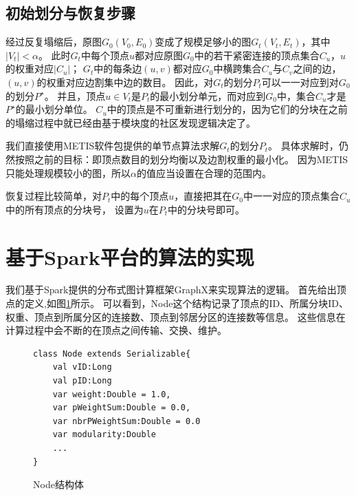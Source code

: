 \documentclass[master]{njuthesis}
\begin{document}
\subsection{初始划分与恢复步骤}
经过反复塌缩后，原图$G_0(V_0,E_0)$变成了规模足够小的图$G_t(V_t,E_t)$，其中$|V_t| < \alpha$。
此时$G_t$中每个顶点$u$都对应原图$G_0$中的若干紧密连接的顶点集合$C_u$，$u$的权重对应$|C_u|$；
$G_t$中的每条边$(u,v)$都对应$G_0$中横跨集合$C_u$与$C_v$之间的边，$(u,v)$的权重对应边割集中边的数目。
因此，对$G_t$的划分$P_t$可以一一对应到对$G_0$的划分$P^\star$。
并且，顶点$u \in V_t$是$P_t$的最小划分单元，而对应到$G_0$中，集合$C_u$才是$P^\star$的最小划分单位。
$C_u$中的顶点是不可重新进行划分的，因为它们的分块在之前的塌缩过程中就已经由基于模块度的社区发现逻辑决定了。

我们直接使用METIS软件包提供的单节点算法求解$G_t$的划分$P_t$。
具体求解时，仍然按照之前的目标：即顶点数目的划分均衡以及边割权重的最小化。
因为METIS只能处理规模较小的图，所以$\alpha$的值应当设置在合理的范围内。

恢复过程比较简单，对$P_t$中的每个顶点$u$，直接把其在$G_0$中一一对应的顶点集合$C_u$中的所有顶点的分块号，
设置为$u$在$P_t$中的分块号即可。

\section{基于Spark平台的算法的实现}
我们基于Spark提供的分布式图计算框架GraphX来实现算法的逻辑。
首先给出顶点的定义,如图\ref{fig:node_struct}所示。
可以看到，Node这个结构记录了顶点的ID、所属分块ID、权重、顶点到所属分区的连接数、顶点到邻居分区的连接数等信息。
这些信息在计算过程中会不断的在顶点之间传输、交换、维护。
\begin{figure}[h]
  \centering
\begin{lstlisting}
class Node extends Serializable{
    val vID:Long
    val pID:Long
    var weight:Double = 1.0,
    var pWeightSum:Double = 0.0,
    var nbrPWeightSum:Double = 0.0
    var modularity:Double
    ...
}
\end{lstlisting}
  \caption{Node结构体}
   \label{fig:node_struct}
\end{figure}
\end{document}
